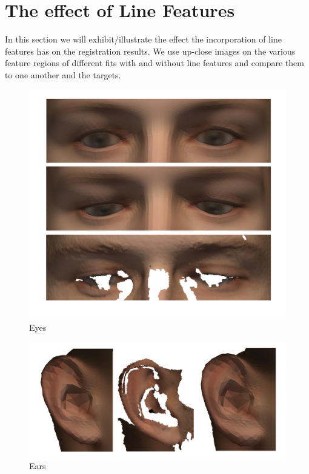 \section{The effect of Line Features}
In this section we will exhibit/illustrate the effect the incorporation of line features has on the registration results. We use up-close images on the various feature regions of different fits with and without line features and compare them to one another and the targets.
\begin{figure}[h!]
    \includegraphics[width=\textwidth]{./resources/img/00029_eyes_comparison.pdf}
\caption{Eyes}
\label{fig:fiteyes}
\end{figure}

\begin{figure}[h!]
    \includegraphics[width=\textwidth]{./resources/img/00029_left_ear_comparison.pdf}
\caption{Ears}
\label{fig:fitears}
\end{figure}

